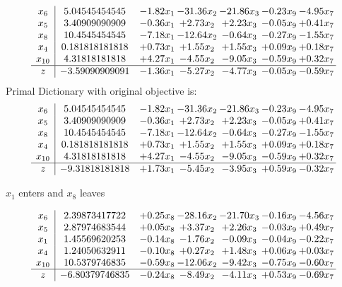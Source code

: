 \documentclass[8pt]{article}
\begin{document}
\[\begin{array}{c| c c@{\hskip 2pt} c@{\hskip 2pt} c@{\hskip 2pt} c@{\hskip 2pt} c@{\hskip 2pt} }
 x_{6}   &  5.04545454545 & -1.82 x_{1} & -31.36 x_{2} & -21.86 x_{3} & -0.23 x_{9} & -4.95 x_{7}\\
 x_{5}   &  3.40909090909 & -0.36 x_{1} & +  2.73 x_{2} & +  2.23 x_{3} & -0.05 x_{9} & +  0.41 x_{7}\\
 x_{8}   &  10.4545454545 & -7.18 x_{1} & -12.64 x_{2} & -0.64 x_{3} & -0.27 x_{9} & -1.55 x_{7}\\
 x_{4}   &  0.181818181818 & +  0.73 x_{1} & +  1.55 x_{2} & +  1.55 x_{3} & +  0.09 x_{9} & +  0.18 x_{7}\\
 x_{10}   &  4.31818181818 & +  4.27 x_{1} & -4.55 x_{2} & -9.05 x_{3} & -0.59 x_{9} & +  0.32 x_{7}\\
\hline
z    &  -3.59090909091 & -1.36 x_{1} & -5.27 x_{2} & -4.77 x_{3} & -0.05 x_{9} & -0.59 x_{7}\\
\end{array}\]
Primal Dictionary with original objective is:
\[\begin{array}{c| c c@{\hskip 2pt} c@{\hskip 2pt} c@{\hskip 2pt} c@{\hskip 2pt} c@{\hskip 2pt} }
 x_{6}   &  5.04545454545 & -1.82 x_{1} & -31.36 x_{2} & -21.86 x_{3} & -0.23 x_{9} & -4.95 x_{7}\\
 x_{5}   &  3.40909090909 & -0.36 x_{1} & +  2.73 x_{2} & +  2.23 x_{3} & -0.05 x_{9} & +  0.41 x_{7}\\
 x_{8}   &  10.4545454545 & -7.18 x_{1} & -12.64 x_{2} & -0.64 x_{3} & -0.27 x_{9} & -1.55 x_{7}\\
 x_{4}   &  0.181818181818 & +  0.73 x_{1} & +  1.55 x_{2} & +  1.55 x_{3} & +  0.09 x_{9} & +  0.18 x_{7}\\
 x_{10}   &  4.31818181818 & +  4.27 x_{1} & -4.55 x_{2} & -9.05 x_{3} & -0.59 x_{9} & +  0.32 x_{7}\\
\hline
z    &  -9.31818181818 & +  1.73 x_{1} & -5.45 x_{2} & -3.95 x_{3} & +  0.59 x_{9} & -0.32 x_{7}\\
\end{array}\]


 $ x_{1} $ enters and $ x_{8} $ leaves 

 \[\begin{array}{c| c c@{\hskip 2pt} c@{\hskip 2pt} c@{\hskip 2pt} c@{\hskip 2pt} c@{\hskip 2pt} }
 x_{6}   &  2.39873417722 & +  0.25 x_{8} & -28.16 x_{2} & -21.70 x_{3} & -0.16 x_{9} & -4.56 x_{7}\\
 x_{5}   &  2.87974683544 & +  0.05 x_{8} & +  3.37 x_{2} & +  2.26 x_{3} & -0.03 x_{9} & +  0.49 x_{7}\\
 x_{1}   &  1.45569620253 & -0.14 x_{8} & -1.76 x_{2} & -0.09 x_{3} & -0.04 x_{9} & -0.22 x_{7}\\
 x_{4}   &  1.24050632911 & -0.10 x_{8} & +  0.27 x_{2} & +  1.48 x_{3} & +  0.06 x_{9} & +  0.03 x_{7}\\
 x_{10}   &  10.5379746835 & -0.59 x_{8} & -12.06 x_{2} & -9.42 x_{3} & -0.75 x_{9} & -0.60 x_{7}\\
\hline
z    &  -6.80379746835 & -0.24 x_{8} & -8.49 x_{2} & -4.11 x_{3} & +  0.53 x_{9} & -0.69 x_{7}\\
\end{array}\]
\end{document}
